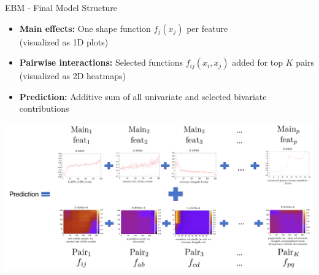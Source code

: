 \documentclass[10pt,compress,t,notes=noshow, xcolor=table]{beamer}
\begin{document}
\begin{frame}{EBM - Final Model Structure}

\begin{itemize}
    \item \textbf{Main effects:} One shape function $f_j(x_j)$ per feature \\(visualized as 1D plots)
    \item \textbf{Pairwise interactions:} Selected functions $f_{ij}(x_i, x_j)$ added for top $K$ pairs (visualized as 2D heatmaps)
    \item \textbf{Prediction:} Additive sum of all univariate and selected bivariate contributions
\end{itemize}

\vspace{0.3cm}
\centering
\includegraphics[width=\linewidth]{figure/final_ebm.png}

\end{frame}
\end{document}
